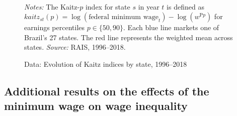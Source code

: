 \begin{figure}[!htb]
  \centering
  \caption{\label{fig: kaitz}Data: Evolution of Kaitz indices by state, 1996--2018}
  \prefigvspace
  \hspace*{\fill}%
  \centerhfill[\qquad\qquad\qquad\qquad\qquad]
  \hspace*{\fill}
  \\
  \postfigvspace
  \begin{minipage}[t]{1\columnwidth}%
    \begin{spacing}{0.75}
      \emph{\scriptsize{}Notes: }{\scriptsize{}The Kaitz-$p$ index for state $s$ in year $t$ is defined as
      $kaitz_{st}(p)=\log\left(\text{federal minimum wage}_{t}\right)-\log\left(w^{\text{P}p}\right)$ for earnings percentiles $p \in \{ 50, 90 \}$. Each blue line markets one of Brazil's 27 states. The red line represents the weighted mean across states. %
      \emph{\scriptsize{}Source: }RAIS, 1996--2018.}
    \end{spacing}
  \end{minipage}
\end{figure}




\clearpage
\subsection{Additional results on the effects of the minimum wage on wage inequality\label{app_subsection:lee_regressions}}

